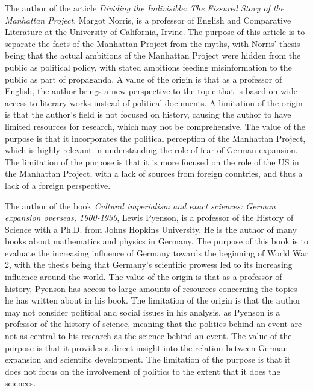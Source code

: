 \documentclass[a4paper,12pt]{article}
\begin{document}
        The author of the article \textit{Dividing the Indivisible: The Fissured Story of the
        Manhattan Project}, Margot Norris, is a professor of English and Comparative Literature at
        the University of California, Irvine. The purpose of this article is to separate the facts
        of the Manhattan Project from the myths, with Norris' thesis being that the actual ambitions
        of the Manhattan Project were hidden from the public as political policy, with stated
        ambitions feeding misinformation to the public as part of propaganda. A value of the origin
        is that as a professor of English, the author brings a new perspective to the topic that is
        based on wide access to literary works instead of political documents. A limitation of the
        origin is that the author's field is not focused on history, causing the author to have
        limited resources for research, which may not be comprehensive. The value of the purpose is
        that it incorporates the political perception of the Manhattan Project, which is highly
        relevant in understanding the role of fear of German expansion. The limitation of the
        purpose is that it is more focused on the role of the US in the Manhattan Project, with a
        lack of sources from foreign countries, and thus a lack of a foreign perspective.

        The author of the book \textit{Cultural imperialism and exact sciences: German expansion
        overseas, 1900-1930}, Lewis Pyenson, is a professor of the History of Science with a Ph.D.
        from Johns Hopkins University. He is the author of many books about mathematics and physics
        in Germany. The purpose of this book is to evaluate the increasing influence of Germany
        towards the beginning of World War 2, with the thesis being that Germany's scientific
        prowess led to its increasing influence around the world. The value of the origin is that as
        a professor of history, Pyenson has access to large amounts of resources concerning the
        topics he has written about in his book. The limitation of the origin is that the author may
        not consider political and social issues in his analysis, as Pyenson is a professor of the
        history of science, meaning that the politics behind an event are not as central to his
        research as the science behind an event. The value of the purpose is that it provides a
        direct insight into the relation between German expansion and scientific development. The
        limitation of the purpose is that it does not focus on the involvement of politics to the
        extent that it does the sciences.
\end{document}
